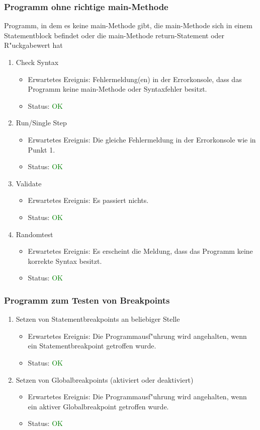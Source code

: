 \subsubsection{Programm ohne richtige main-Methode}
Programm, in dem es keine main-Methode gibt, die main-Methode sich in einem Statementblock befindet oder die main-Methode return-Statement oder R"uckgabewert hat
\begin{enumerate}
\item Check Syntax
\begin{itemize}
\item Erwartetes Ereignis: Fehlermeldung(en) in der Errorkonsole, dass das Programm keine main-Methode oder Syntaxfehler besitzt.
\item Status: \textcolor{green}{OK}
\end{itemize}
\item Run/Single Step
\begin{itemize}
\item Erwartetes Ereignis: Die gleiche Fehlermeldung in der Errorkonsole wie in Punkt 1. 
\item Status: \textcolor{green}{OK}
\end{itemize}
\item Validate
\begin{itemize}
\item Erwartetes Ereignis: Es passiert nichts. 
\item Status: \textcolor{green}{OK}
\end{itemize}
\item Randomtest
\begin{itemize}
\item Erwartetes Ereignis: Es erscheint die Meldung, dass das Programm keine korrekte Syntax besitzt. 
\item Status: \textcolor{green}{OK}
\end{itemize}
\end{enumerate}
\subsubsection{Programm zum Testen von Breakpoints}
\begin{enumerate}
\item Setzen von Statementbreakpoints an beliebiger Stelle
\begin{itemize}
\item Erwartetes Ereignis: Die Programmausf"uhrung wird angehalten, wenn ein Statementbreakpoint getroffen wurde.
\item Status: \textcolor{green}{OK}
\end{itemize}
\item Setzen von Globalbreakpoints (aktiviert oder deaktiviert)
\begin{itemize}
\item Erwartetes Ereignis: Die Programmausf"uhrung wird angehalten, wenn ein aktiver Globalbreakpoint getroffen wurde.
\item Status: \textcolor{green}{OK}
\end{itemize}
\end{enumerate}
